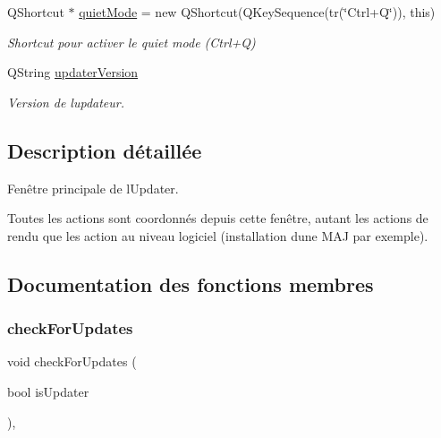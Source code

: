 \begin{DoxyCompactItemize}
\mbox{\label{classmainWindow_a012ed0f09b57bc925a14d6e93baa73e9}} 
Q\+Shortcut $\ast$ \hyperlink{classmainWindow_a012ed0f09b57bc925a14d6e93baa73e9}{quiet\+Mode} = new Q\+Shortcut(Q\+Key\+Sequence(tr(\char`\"{}Ctrl+Q\char`\"{})), this)
\begin{DoxyCompactList}\small\item\em Shortcut pour activer le quiet mode (Ctrl+Q) \end{DoxyCompactList}\item 
\mbox{\label{classmainWindow_a0670d734754fdc067c4990ab033ab8a1}} 
Q\+String \hyperlink{classmainWindow_a0670d734754fdc067c4990ab033ab8a1}{updater\+Version}
\begin{DoxyCompactList}\small\item\em Version de l\textquotesingle{}updateur. \end{DoxyCompactList}\end{DoxyCompactItemize}


\subsection{Description détaillée}
Fenêtre principale de l\textquotesingle{}Updater. 

Toutes les actions sont coordonnés depuis cette fenêtre, autant les actions de rendu que les action au niveau logiciel (installation d\textquotesingle{}une M\+AJ par exemple). 

\subsection{Documentation des fonctions membres}
\mbox{\label{classmainWindow_a52d5ce0b17a87a34ac1038508e3a5c45}} 
\subsubsection{\texorpdfstring{check\+For\+Updates}{checkForUpdates}}
{\footnotesize\ttfamily void check\+For\+Updates (\begin{DoxyParamCaption}\item[{bool}]{is\+Updater }\end{DoxyParamCaption})\hspace{0.3cm}{\ttfamily [private]}, {\ttfamily [slot]}}



